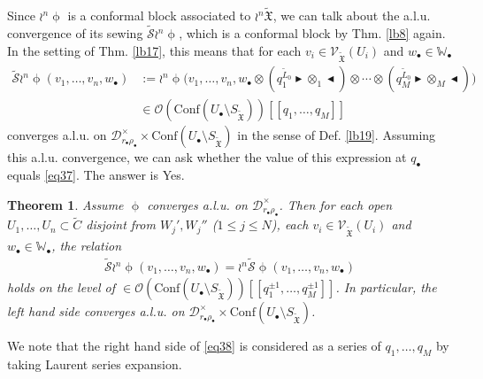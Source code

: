 \documentclass[12pt,a4paper,notitlepage]{article}
\theoremstyle{definition}
\theoremstyle{plain}
\newtheorem{thm}[df]{Theorem}
\newcommand{\fk}{\mathfrak}
\newcommand{\mc}{\mathcal}
\newcommand{\wtd}{\widetilde}
\newcommand{\Conf}{\mathrm{Conf}}
\newcommand{\scr}{\mathscr}
\newcommand{\blt}{\bullet}
\newcommand{\Wbb}{\mathbb W}
\newcommand{\btl}{\blacktriangleleft}
\newcommand{\btr}{\blacktriangleright}
\newcommand{\SXtd}{S_{\wtd{\fk X}}}
\numberwithin{equation}{section}
\begin{document}
Since $\wr^n\upphi$ is a conformal block associated to $\wr^n\wtd{\fk X}$, we can talk about the a.l.u. convergence of its sewing $\wtd{\mc S}\wr^n\upphi$, which is a conformal block by Thm. \ref{lb8} again. In the setting of Thm. \ref{lb17}, this means that for each $v_i\in\scr V_{\wtd{\fk X}}(U_i)$ and $w_\blt\in\Wbb_\blt$
\begin{align}
\wtd{\mc S}\wr^n\upphi(v_1,\dots,v_n,w_\blt)&:=\wr^n\upphi\Big(v_1,\dots,v_n,w_\blt\otimes(q_1^{\wtd  L_0}\btr\otimes_1\btl)\otimes\cdots\otimes (q_M^{\wtd  L_0}\btr\otimes_M\btl)\Big)	\label{eq39}\\
&\in\scr O(\Conf(U_\blt\setminus\SXtd))[[q_1,\dots,q_M]]\nonumber
\end{align}
converges a.l.u. on $\mc D_{r_\blt\rho_\blt}^\times\times \Conf(U_\blt\setminus\SXtd)$ in the sense of Def. \ref{lb19}. Assuming this a.l.u. convergence, we can ask whether the value of this expression at $q_\blt$ equals \eqref{eq37}. The answer is Yes.

\begin{thm}\label{lb21}
Assume $\upphi$ converges a.l.u. on $\mc D_{r_\blt\rho_\blt}^\times$. Then for each open $U_1,\dots,U_n\subset \wtd C$ disjoint from $W_j',W_j''$ ($1\leq j\leq N$), each $v_i\in\scr V_{\wtd{\fk X}}(U_i)$ and $w_\blt\in\Wbb_\blt$, the relation
\begin{align}
\wtd{\mc S}\wr^n\upphi(v_1,\dots,v_n,w_\blt)=	\wr^n\wtd{\mc S}\upphi(v_1,\dots,v_n,w_\blt)\label{eq38}
\end{align}
holds on the level of $\in\scr O(\Conf(U_\blt\setminus\SXtd))[[q_1^{\pm 1},\dots,q_M^{\pm 1}]]$. In particular, the left hand side converges a.l.u. on $\mc D_{r_\blt\rho_\blt}^\times\times\Conf(U_\blt\setminus\SXtd)$.
\end{thm}
We note that the right hand side of \eqref{eq38} is considered as a series of $q_1,\dots,q_M$ by taking Laurent series expansion.
\end{document}
